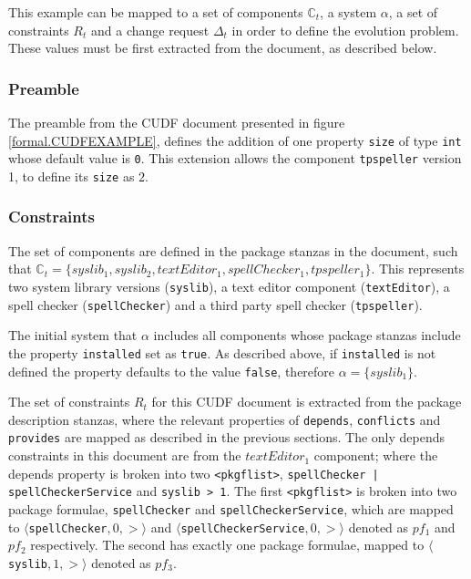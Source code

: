 This example can be mapped to a set of components $\mathbb{C}_t$, a system $\alpha$, a set of constraints $R_t$ and a change request $\Delta_t$ in order to define the evolution problem.
These values must be first extracted from the document, as described below.

\subsubsection{Preamble}
The preamble from the CUDF document presented in figure \ref{formal.CUDFEXAMPLE}, 
defines the addition of one property \verb+size+ of type \verb+int+ whose default value is \verb+0+.
This extension allows the component \verb+tpspeller+ version 1, to define its \verb+size+ as $2$.

\subsubsection{Constraints}

The set of components are defined in the package stanzas in the document,
such that $\mathbb{C}_t = \{syslib_1, syslib_2,  textEditor_1,  spellChecker_1,  tpspeller_1\}$.
This represents two system library versions (\verb+syslib+), a text editor component (\verb+textEditor+), a spell checker (\verb+spellChecker+) and a third party spell checker (\verb+tpspeller+).

The initial system that $\alpha$ includes all components whose package stanzas include the property \verb+installed+ set as \verb+true+.
As described above, if \verb+installed+ is not defined the property defaults to the value \verb+false+,
therefore $\alpha = \{ syslib_1 \}$.

The set of constraints $R_t$ for this CUDF document is extracted from the package description stanzas, where the relevant properties of \verb+depends+, \verb+conflicts+ and \verb+provides+ are
mapped as described in the previous sections. 
The only depends constraints in this document are from the $textEditor_1$ component;
where the depends property is broken into two \verb+<pkgflist>+, \verb+spellChecker | spellCheckerService+ and \verb+syslib > 1+.
The first \verb+<pkgflist>+ is broken into two package formulae, \verb+spellChecker+  and \verb+spellCheckerService+,
which are mapped to $\langle $\verb+spellChecker+$,0,>\rangle$ and $\langle $\verb+spellCheckerService+$,0,>\rangle$ denoted as $pf_1$ and $pf_2$ respectively.
The second has exactly one package formulae, mapped to $\langle $\verb+syslib+$,1,>\rangle$ denoted as $pf_3$.


